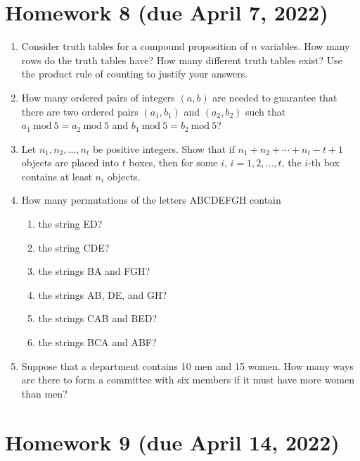 \documentclass[letterpaper, 12pt]{article}
\newcommand{\Mod}[1]{\ \mathrm{mod}\ #1}
\begin{document}
\section*{Homework 8 (due April 7, 2022)}

\begin{enumerate}
    \item Consider truth tables for a compound proposition of $n$ variables. How many rows do the truth tables have? How many different truth tables exist? Use the product rule of counting to justify your answers.
    \item How many ordered pairs of integers $(a,b)$ are needed to guarantee that there are two ordered pairs $(a_1, b_1)$ and $(a_2, b_2)$ such that $a_1 \Mod{5} = a_2 \Mod{5}$ and $b_1 \Mod{5} = b_2 \Mod{5}$?
    \item Let $n_1, n_2, \ldots, n_t$ be positive integers. Show that if $n_1 + n_2 + \cdots + n_t - t + 1$ objects are placed into $t$ boxes, then for some $i$, $i = 1, 2, \ldots, t$, the $i$-th box contains at least $n_i$ objects.
    \item How many permutations of the letters ABCDEFGH contain
    \begin{enumerate}
        \item the string ED?
        \item the string CDE?
        \item the strings BA and FGH?
        \item the strings AB, DE, and GH?
        \item the strings CAB and BED?
        \item the strings BCA and ABF?
    \end{enumerate}
    \item Suppose that a department contains 10 men and 15 women. How many ways are there to form a committee with six members if it must have more women than men?
\end{enumerate}

\section*{Homework 9 (due April 14, 2022)}
\end{document}

